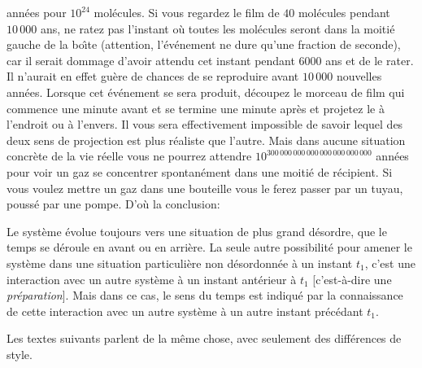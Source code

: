 ann\'ees pour $10^{24}$ mol\'ecules. Si vous regardez le film de $40$ 
mol\'ecules pendant $10\, 000$ ans, ne ratez pas l'instant o\`u toutes 
les mol\'ecules seront dans la moi\-ti\'e gauche de la bo{\^\i}te 
(attention, l'\'ev\'enement ne dure qu'une fraction de se\-con\-de), car il 
serait dommage d'avoir attendu cet instant pendant $6000$ ans et de le 
rater. Il n'aurait en effet gu\`ere de chances de se reproduire avant 
$10\, 000$ nouvelles ann\'ees. Lorsque cet \'ev\'enement se sera produit, 
d\'ecoupez le morceau de film qui commence une minute avant et se termine 
une minute apr\`es et projetez le \`a l'endroit ou \`a l'envers. Il vous 
sera effectivement impossible de savoir lequel des deux sens de projection 
est plus r\'ealiste que l'autre. 
\medskip
Mais dans aucune situation concr\`ete de la vie r\'eelle vous ne pourrez 
attendre $10^{300\, 000\, 000\, 000\, 000\, 000\, 000\, 000}$ 
ann\'ees pour voir un gaz se concentrer spontan\'ement dans une moiti\'e de 
r\'ecipient. Si vous voulez mettre un gaz dans une bouteille vous le ferez 
passer par un tuyau, pouss\'e par une pompe. D'o\`u la conclusion: 
\medskip
{\cit  Le syst\`eme \'evolue toujours vers une situation de plus grand
d\'esordre, que le temps se d\'eroule en avant ou en arri\`ere. 
La seule autre possibilit\'e pour amener le syst\`eme dans une situation
particuli\`ere non d\'esordonn\'ee \`a un instant $t_1$, c'est une 
interaction avec un autre syst\`eme \`a un instant ant\'erieur \`a $t_1$
[c'est-\`a-dire une {\it pr\'eparation}]. Mais dans ce cas, le sens du 
temps est indiqu\'e par la connaissance de cette interaction avec un autre
syst\`eme \`a un autre instant pr\'ec\'edant $t_1$. \par }

\bigskip

Les textes suivants parlent de la m\^eme chose, avec seulement des 
diff\'erences de style.

\bigskip

